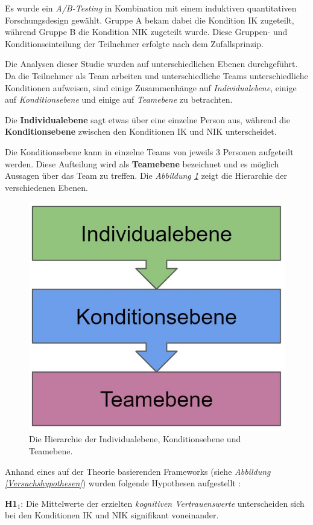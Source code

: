 \documentclass[sigchi]{acmart}
\begin{document}
Es wurde ein \textit{A/B-Testing} in Kombination mit einem induktiven quantitativen Forschungsdesign gewählt.
Gruppe A bekam dabei die Kondition IK zugeteilt, während Gruppe B die Kondition NIK zugeteilt wurde. Diese Gruppen- und Konditionseinteilung der Teilnehmer erfolgte nach dem Zufallsprinzip. 

Die Analysen dieser Studie wurden auf unterschiedlichen Ebenen durchgeführt.
Da die Teilnehmer als Team arbeiten und unterschiedliche Teams unterschiedliche Konditionen aufweisen, sind einige Zusammenhänge auf \textit{Individualebene}, einige auf \textit{Konditionsebene} und einige auf \textit{Teamebene} zu betrachten.

Die \textbf{Individualebene} sagt etwas über eine einzelne Person aus, während die \textbf{Konditionsebene} zwischen den Konditionen IK und NIK unterscheidet.

Die Konditionsebene kann in einzelne Teams von jeweils 3 Personen aufgeteilt werden. Diese Aufteilung wird als \textbf{Teamebene} bezeichnet und es möglich Aussagen über das Team zu treffen. 
Die \textit{Abbildung \ref{DifferentLevels}} zeigt die Hierarchie der verschiedenen Ebenen.

\begin{figure}[H]
		\begin{footnotesize}
		\centering
			\includegraphics[width=0.5\linewidth]{Abbildungen/DifferentLevels.JPG}	
			\caption[Die Hierarchieebenen]{Die Hierarchie der Individualebene, Konditionsebene und Teamebene.}
			\label{DifferentLevels}
		\end{footnotesize}
	\end{figure}

Anhand eines auf der Theorie basierenden Frameworks (siehe \textit{Abbildung \ref{Versuchshypothesen}}) wurden folgende Hypothesen aufgestellt :

\textbf{H1$_{1}$}: Die Mittelwerte der erzielten \textit{kognitiven Vertrauenswerte} unterscheiden sich bei den Konditionen IK und NIK signifikant voneinander.
\end{document}
